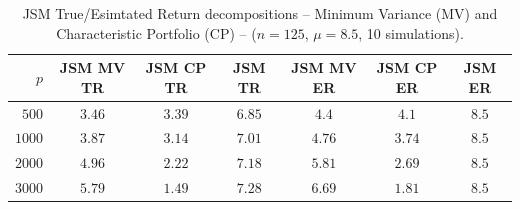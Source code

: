 \begin{table}[hpt!] 
\begin{center} 
\begin{tabular}{rcccccc} 
\toprule 
$p$ & JSM MV TR  & JSM CP TR & JSM TR & JSM MV ER & JSM CP ER & JSM ER \\ 
\midrule 
$500$  & $3.46$ & $3.39$ & $6.85$ & $4.4$ & $4.1$ & $8.5$ \\ 
$1000$  & $3.87$ & $3.14$ & $7.01$ & $4.76$ & $3.74$ & $8.5$ \\ 
$2000$  & $4.96$ & $2.22$ & $7.18$ & $5.81$ & $2.69$ & $8.5$ \\ 
$3000$  & $5.79$ & $1.49$ & $7.28$ & $6.69$ & $1.81$ & $8.5$ \\ 
\bottomrule 
\end{tabular} 
\end{center} 
\caption{JSM True/Esimtated Return decompositions -- Minimum Variance (MV) and Characteristic Portfolio (CP) -- ($n = 125$, $\mu = 8.5$,  10 simulations).} 
\label{tab:jsmRD} 
\end{table} 

 
